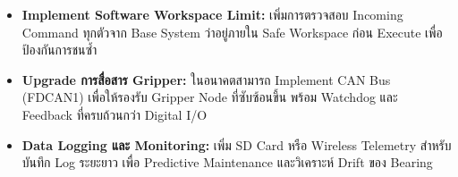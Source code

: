 \begin{itemize}
  \item \textbf{Implement Software Workspace Limit:}
        เพิ่มการตรวจสอบ Incoming Command ทุกตัวจาก Base System
        ว่าอยู่ภายใน Safe Workspace ก่อน Execute
        เพื่อป้องกันการชนซ้ำ

  \item \textbf{Upgrade การสื่อสาร Gripper:}
        ในอนาคตสามารถ Implement CAN Bus (FDCAN1)
        เพื่อให้รองรับ Gripper Node ที่ซับซ้อนขึ้น
        พร้อม Watchdog และ Feedback ที่ครบถ้วนกว่า Digital I/O

  \item \textbf{Data Logging และ Monitoring:}
        เพิ่ม SD Card หรือ Wireless Telemetry
        สำหรับบันทึก Log ระยะยาว
        เพื่อ Predictive Maintenance และวิเคราะห์ Drift ของ Bearing
\end{itemize}